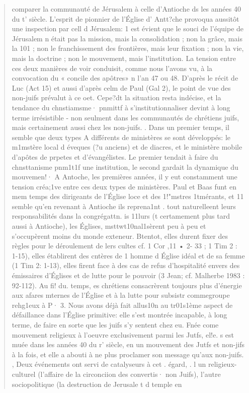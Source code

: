 \begin{quote}
    comparer la communauté de Jérusalem à celle d'Antioche ds les
années 40 du t' siècle. L'esprit de pionnier de l'Église d' Antt?che
provoqua aussitôt une inspection par cell d Jérusalem: 1 est évient
que le souci de l'équipe de Jérusalem n était pas la mission, mais la
consolidation ; non la grâce, mais la 101 ; non le franchissement des
frontières, mais leur fixation ; non la vie, mais la doctrine ; non le
mouvement, mais l'institution.
La tension entre ces deux manières de voir conduisit, comme nous
l'avons vu, à la convocation du « concile des apôtres» n l'an 47 ou
48. D'après le récit de Luc (Act 15) et aussi d'après celm de Paul (Gal
2), le point de vue des non-juifs prévalut à ce oet. Cepe?dt la
situation resta indécise, et la tendance du chnstiamsme· pnmittf à
s'institutionnaliser devint à long terme irrésistible - non seulment
dans les communautés de chrétiens juifs, mais certainement aussi chez
les non-juifs. .
Dans un premier temps, il semble que deux types A différents de
ministères se sont développés: le m1mstère local d éveques (?u anciens)
et de diacres, et le ministère mobile d'apôtes de prpetes et
d'évangélistes. Le premier tendait à faire du chnsttanisme pnm1t1f une
institution, le second gardait la dynamique du mouvemen!· A Antoche,
les premières années, il y eut constamment une tension créa;1ve
entre ces deux types de ministères. Paul et Baas funt en mem
temps des dirigeants de l'Église loce et des 1!"mstres 1tmérants, et 11
semble qu'en revenant à Antioche ils reprena1nt . tout naturelleent
leurs responsabilités dans la congrégattn. is 11lurs (t certamement
plus tard aussi à Antioche), les Églises,  msttwt10nal1sèrent peu
à peu et s'occupèrent moins du monde exteneur. Btentot, elles durent
fixer des règles pour le déroulement de lers cultes cf. 1 Cor ,11 • 2-
33 ; 1 Tim 2 : 1-15), elles établirent des cntères de 1 homme d Église
idéal et de sa femme (1 Tim 2: 1-13), elles firent face à des cas de
refus d'hospitalité envers des émissaires d'Églises et de lutte pour le
pouvoir (3 Jean; cf. Malherbe 1983 : 92-112). Au fi! du. temps, es
chrétiens consacrèrent toujours plus d'énergie aux afares mternes de
l'Église et à la lutte pour subsistr commegroupe rehg1eux à P·
3. Nous avons déjà fait allus10n au tr01s1ème aspect de défaillance
dans l'Église primitive: elle s'est montrée incapable, à long terme, de
faire en sorte que les juifs s'y sentent chez eu. Fnée come
mouvement religieux à l'oeuvre exclusivement parmi les Jutfs, el!e. s est
muée dans les années 40 du r' siècle, en un mouvement des Jutfs et
non-jifs à la fois, et elle a abouti à ne plus proclamer son message
qu'aux non-juifs. ,
Deux événements ont servi de catalyseurs à cet . égard, . l un
religieux-culturel (l'affaire de la circonciion des convertis· non Juifs),
l'autre sociopolitique (la destruction de Jerusale t d temple en 
\end{quote}

